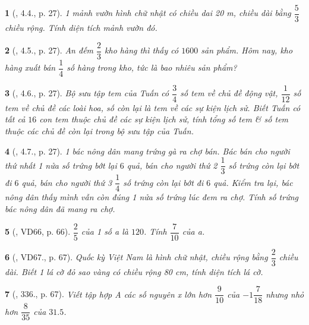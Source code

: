 \documentclass{article}
\newtheorem{baitoan}{}
\begin{document}
\begin{baitoan}[\cite{Binh_boi_duong_Toan_6_tap_2}, 4.4., p. 27]
	1 mảnh vườn hình chữ nhật có chiều dai {\rm20 m}, chiều dài bằng $\dfrac{5}{3}$ chiều rộng. Tính diện tích mảnh vườn đó.
\end{baitoan}

\begin{baitoan}[\cite{Binh_boi_duong_Toan_6_tap_2}, 4.5., p. 27]
	An đếm $\dfrac{2}{3}$ kho hàng thì thấy có $1600$ sản phẩm. Hôm nay, kho hàng xuất bán $\dfrac{1}{4}$ số hàng trong kho, tức là bao nhiêu sản phẩm?
\end{baitoan}

\begin{baitoan}[\cite{Binh_boi_duong_Toan_6_tap_2}, 4.6., p. 27]
	Bộ sưu tập tem của Tuấn có $\dfrac{3}{4}$ số tem về chủ đề động vật, $\dfrac{1}{12}$ số tem về chủ đề các loài hoa, số còn lại là tem về các sự kiện lịch sử. Biết Tuấn có tất cả $16$ con tem thuộc chủ đề các sự kiện lịch sử, tính tổng số tem \& số tem thuộc các chủ đề còn lại trong bộ sưu tập của Tuấn.
\end{baitoan}

\begin{baitoan}[\cite{Binh_boi_duong_Toan_6_tap_2}, 4.7., p. 27]
	1 bác nông dân mang trứng gà ra chợ bán. Bác bán cho người thứ nhất 1 nửa số trứng bớt lại $6$ quả, bán cho người thứ 2 $\dfrac{1}{3}$ số trứng còn lại bớt đi $6$ quả, bán cho người thứ 3 $\dfrac{1}{4}$ số trứng còn lại bớt đi $6$ quả. Kiểm tra lại, bác nông dân thấy mình vẫn còn đúng 1 nửa số trứng lúc đem ra chợ. Tính số trứng bác nông dân đã mang ra chợ.
\end{baitoan}

\begin{baitoan}[\cite{Tuyen_Toan_6}, VD66, p. 66]
	$\dfrac{2}{5}$ của 1 số a là $120$. Tính $\dfrac{7}{10}$ của a.
\end{baitoan}

\begin{baitoan}[\cite{Tuyen_Toan_6}, VD67., p. 67]
	Quốc kỳ Việt Nam là hình chữ nhật, chiều rộng bằng $\dfrac{2}{3}$ chiều dài. Biết 1 lá cờ đỏ sao vàng có chiều rộng {\rm80 cm}, tính diện tích lá cờ.
\end{baitoan}

\begin{baitoan}[\cite{Tuyen_Toan_6}, 336., p. 67]
	Viết tập hợp A các số nguyên x lớn hơn $\dfrac{9}{10}$ của $-1\dfrac{7}{18}$ nhưng nhỏ hơn $\dfrac{8}{35}$ của $31.5$.
\end{baitoan}
\end{document}
